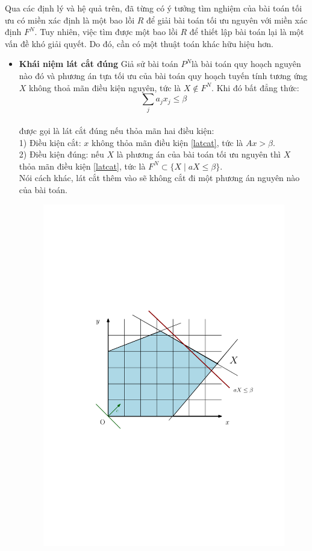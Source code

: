 \documentclass[12pt,a4paper]{report}
\begin{document}
Qua các định lý và hệ quả trên, đã từng có ý tưởng tìm nghiệm của bài toán tối ưu có miền xác định là một bao lồi $R$ để giải bài toán tối ưu nguyên với miền xác định $F^N$. Tuy nhiên, việc tìm được một bao lồi $R$ để thiết lập bài toán lại là một vấn đề khó giải quyết. Do đó, cần có một thuật toán khác hữu hiệu hơn.\\ 
\begin{itemize}
    \item \textbf{Khái niệm lát cắt đúng}
    Giả sử bài toán $P^N$là bài toán quy hoạch nguyên nào đó và phương án tựa tối ưu của bài toán quy hoạch tuyến tính tương ứng $X$ không thoả mãn điều kiện 
nguyên, tức là $X \notin  F^N$. Khi đó bất đẳng thức:
    $$\sum _j a_jx_j \le \beta$$\label{latcat}\\
    được gọi là lát cắt đúng nếu thỏa mãn hai điều kiện:\\
    1) Điều kiện cắt: $x$ không thỏa mãn điều kiện \eqref{latcat}, tức là $Ax > \beta$.\\
    2) Điều kiện đúng: nếu $X$ là phương án của bài toán tối ưu nguyên thì $X$ thỏa mãn điều kiện \eqref{latcat}, tức là 
 $F^N \subset \{X\mid aX\le \beta\}$.\\
    Nói cách khác, lát cắt thêm vào sẽ không cắt đi một phương án nguyên nào của bài toán.\\
    
    
    \begin{figure}[h]
        \centering
        \includegraphics[width=0.8\linewidth]{anh2 (1).pdf}
       

\end{figure}
\end{itemize}
\end{document}

